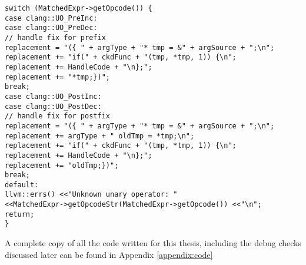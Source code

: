 \begin{center}
\parbox{0.95\linewidth}{
\texttt{switch (MatchedExpr-\textgreater getOpcode()) \{\\
\hspace*{2em}case clang::UO\_PreInc:\\
\hspace*{2em}case clang::UO\_PreDec:\\
\hspace*{4em}// handle fix for prefix\\
\hspace*{4em}replacement = "(\{ " + argType + "* tmp = \&" + argSource + ";\textbackslash n";\\
\hspace*{4em}replacement += "if(" + ckdFunc + "(tmp, *tmp, 1)) \{\textbackslash n";\\
\hspace*{4em}replacement += HandleCode + "\textbackslash n\};";\\
\hspace*{4em}replacement += "*tmp;\})";\\
\hspace*{4em}break;\\[1em]
\hspace*{2em}case clang::UO\_PostInc:\\
\hspace*{2em}case clang::UO\_PostDec:\\
\hspace*{4em}// handle fix for postfix\\
\hspace*{4em}replacement = "(\{ " + argType + "* tmp = \&" + argSource + ";\textbackslash n";\\
\hspace*{4em}replacement += argType + " oldTmp = *tmp;\textbackslash n";\\
\hspace*{4em}replacement += "if(" + ckdFunc + "(tmp, *tmp, 1)) \{\textbackslash n";\\
\hspace*{4em}replacement += HandleCode + "\textbackslash n\};";\\
\hspace*{4em}replacement += "oldTmp;\})";\\
\hspace*{4em}break;\\[1em]
\hspace*{2em}default:\\
\hspace*{4em}llvm::errs() \textless\textless "Unknown unary operator: " \\
\hspace*{6em}\textless\textless MatchedExpr-\textgreater getOpcodeStr(MatchedExpr-\textgreater getOpcode()) \textless\textless "\textbackslash n";\\
\hspace*{4em}return;\\
\}
}}
\end{center}

A complete copy of all the code written for this thesis, including the debug checks discussed later can be found in Appendix \ref{appendix:code}